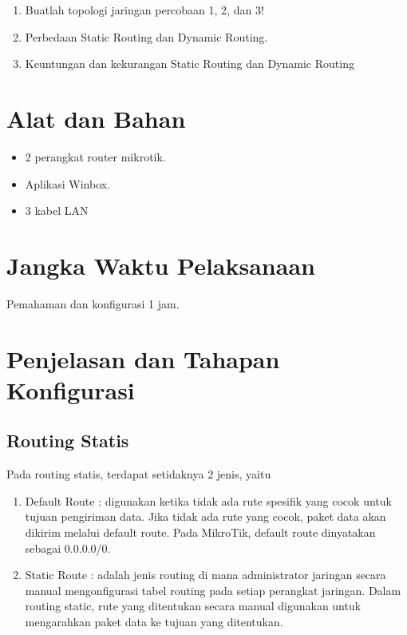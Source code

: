 \begin{center}
	\colorbox{cyan!30}{\parbox{0.8\linewidth}{
		\begin{enumerate}
		\item Buatlah topologi jaringan percobaan 1, 2, dan 3!
		\item Perbedaan Static Routing dan Dynamic Routing.
		\item Keuntungan dan kekurangan Static Routing dan Dynamic Routing
	\end{enumerate}
	}}
\end{center}

\section{Alat dan Bahan}
\begin{itemize}[label=$\bullet$, itemsep=-1pt, leftmargin=*]
	\item 2 perangkat router mikrotik.
	\item Aplikasi Winbox.
	\item 3 kabel LAN
\end{itemize}

\section{Jangka Waktu Pelaksanaan}
Pemahaman dan konfigurasi 1 jam.

\section{Penjelasan dan Tahapan Konfigurasi}

\subsection{Routing Statis}
Pada routing statis, terdapat setidaknya 2 jenis, yaitu
\begin{enumerate}
	\item Default Route : digunakan ketika tidak ada rute spesifik yang cocok untuk tujuan pengiriman data. Jika tidak ada rute yang cocok, paket data akan dikirim melalui default route. Pada MikroTik, default route dinyatakan sebagai 0.0.0.0/0.
	\item Static Route : adalah jenis routing di mana administrator jaringan secara manual mengonfigurasi tabel routing pada setiap perangkat jaringan. Dalam routing static, rute yang ditentukan secara manual digunakan untuk mengarahkan paket data ke tujuan yang ditentukan.
\end{enumerate}

